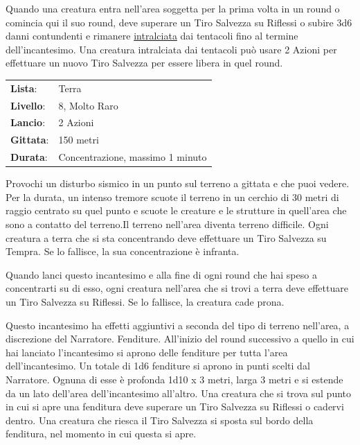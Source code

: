 \begin{multicols}{2}
Quando una creatura entra nell'area soggetta per la prima volta in un round o comincia qui il suo round, deve superare un Tiro Salvezza su Riflessi o subire 3d6 danni contundenti e rimanere \hyperlink{intralciato}{intralciata} dai tentacoli fino al termine dell'incantesimo. Una creatura intralciata dai tentacoli può usare 2 Azioni per effettuare un nuovo Tiro Salvezza per essere libera in quel round.

\noindent\begin{tabularx}{\linewidth}{p{1.3cm}X}
	\rowcolor{gray!20}\textbf{Lista}: & Terra \\
	\textbf{Livello}: & 8, Molto Raro \\
	\rowcolor{gray!20}\textbf{Lancio}: & 2 Azioni \\
	\textbf{Gittata}: & 150 metri \\
	\rowcolor{gray!20}\textbf{Durata}: & Concentrazione, massimo 1 minuto \\
\end{tabularx}\smallskip

Provochi un disturbo sismico in un punto sul terreno a gittata e che puoi vedere. Per la durata, un intenso tremore scuote il terreno in un cerchio di 30 metri di raggio centrato su quel punto e scuote le creature e le strutture in quell'area che sono a contatto del terreno.Il terreno nell'area diventa terreno difficile. Ogni creatura a terra che si sta concentrando deve effettuare un Tiro Salvezza su Tempra. Se lo fallisce, la sua concentrazione è infranta.

Quando lanci questo incantesimo e alla fine di ogni round che hai speso a concentrarti su di esso, ogni creatura nell'area che si trovi a terra deve effettuare un Tiro Salvezza su Riflessi. Se lo fallisce, la creatura cade prona.

Questo incantesimo ha effetti aggiuntivi a seconda del tipo di terreno nell'area, a discrezione del Narratore. Fenditure. All'inizio del round successivo a quello in cui hai lanciato l'incantesimo si aprono delle fenditure per tutta l'area dell'incantesimo. Un totale di 1d6 fenditure si aprono in punti scelti dal Narratore. Ognuna di esse è profonda 1d10 x 3 metri, larga 3 metri e si estende da un lato dell'area dell'incantesimo all'altro. Una creatura che si trova sul punto in cui si apre una fenditura deve superare un Tiro Salvezza su Riflessi o cadervi dentro. Una creatura che riesca il Tiro Salvezza si sposta sul bordo della fenditura, nel momento in cui questa si apre.


\end{multicols}
